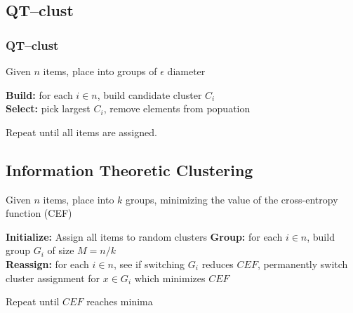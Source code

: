 \documentclass{beamer}
\begin{document}
\subsection{QT--clust}
\begin{frame}
\frametitle{QT--clust}
Given $n$ items, place into groups of $\epsilon$ diameter\\

\bigskip

\textbf{Build:} for each $i \in n$, build candidate cluster $C_i$ \\
\textbf{Select:} pick largest $C_i$, remove elements from popuation \\

\bigskip

Repeat until all items are assigned.

\end{frame}


\subsection{Information Theoretic Clustering}
\begin{frame}
Given $n$ items, place into $k$ groups, minimizing the value of the cross-entropy function (CEF) \\

\bigskip

\textbf{Initialize:} Assign all items to random clusters
\textbf{Group:} for each $i \in n$, build group $G_i$ of size $M = n / k$ \\
\textbf{Reassign:} for each $i \in n$, see if switching $G_i$ reduces $CEF$, permanently switch cluster assignment for $x \in G_i$ which minimizes $CEF$ \\

\bigskip

Repeat until $CEF$ reaches minima
\end{frame}

\end{document}
